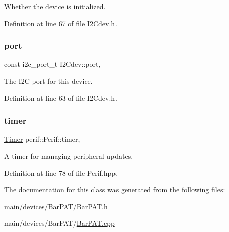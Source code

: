 Whether the device is initialized. 

Definition at line 67 of file I2\+Cdev.\+h.

\mbox{\label{classI2Cdev_a1d1e63732aa9f50369172b27a034129c}} 
\subsubsection{\texorpdfstring{port}{port}}
{\footnotesize\ttfamily const i2c\+\_\+port\+\_\+t I2\+Cdev\+::port\hspace{0.3cm}{\ttfamily [protected]}, {\ttfamily [inherited]}}

The I2C port for this device. 

Definition at line 63 of file I2\+Cdev.\+h.

\mbox{\label{classperif_1_1Perif_acfa1256201bead82ccce1a0a8bcc24e1}} 
\subsubsection{\texorpdfstring{timer}{timer}}
{\footnotesize\ttfamily \mbox{\hyperlink{classTimer}{Timer}} perif\+::\+Perif\+::timer\hspace{0.3cm}{\ttfamily [protected]}, {\ttfamily [inherited]}}

A timer for managing peripheral updates. 

Definition at line 78 of file Perif.\+hpp.



The documentation for this class was generated from the following files\+:\begin{DoxyCompactItemize}
\item 
main/devices/\+Bar\+P\+A\+T/\mbox{\hyperlink{BarPAT_8h}{Bar\+P\+A\+T.\+h}}\item 
main/devices/\+Bar\+P\+A\+T/\mbox{\hyperlink{BarPAT_8cpp}{Bar\+P\+A\+T.\+cpp}}\end{DoxyCompactItemize}

